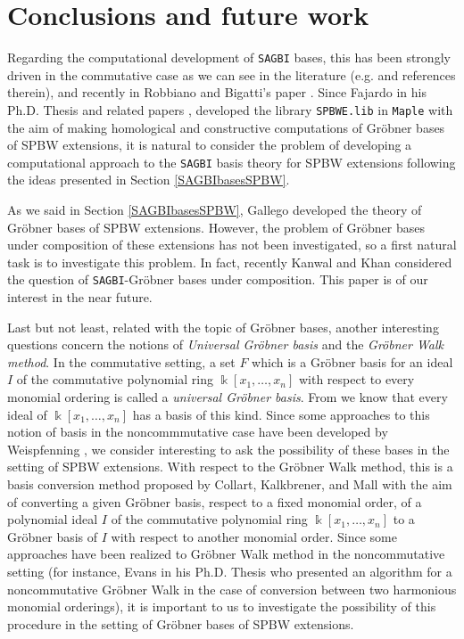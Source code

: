 \documentclass{amsart}
\theoremstyle{definition}
\theoremstyle{remark}
\numberwithin{equation}{section}
\begin{document}
\section{Conclusions and future work}\label{conclusionsfuturework}

 Regarding the computational development of \texttt{SAGBI} bases, this has been strongly driven in the commutative case as we can see in the literature (e.g.  \cite{Hashemietal2013, KreuzerRobbiano2005, Pfister} and references therein), and recently in Robbiano and Bigatti's paper \cite{RobbianoBigatti2022}. Since Fajardo in his Ph.D. Thesis \cite{Fajardo2018PhD} and related papers \cite{Fajardo2019, Fajardo2022}, \cite[Appendices C, D, E]{Fajardoetal2020} developed the library \texttt{SPBWE.lib} in \texttt{Maple} with the aim of making homological and constructive computations of Gr\"obner bases of SPBW extensions, it is natural to consider the problem of developing a computational approach to the \texttt{SAGBI} basis theory for SPBW extensions following the ideas presented in Section \ref{SAGBIbasesSPBW}.
 
As we said in Section \ref{SAGBIbasesSPBW}, Gallego developed the theory of Gr\"obner bases of SPBW extensions. However, the problem of Gr\"obner bases under composition of these extensions has not been investigated, so a first natural task is to investigate this problem. In fact, recently Kanwal and Khan \cite{KanwalKhan2023} considered the question of \texttt{SAGBI}-Gr\"obner bases under composition. This paper is of our interest in the near future.

Last but not least, related with the topic of Gr\"obner bases, another interesting questions concern the notions of {\em Universal Gr\"obner basis} and the {\em Gr\"obner Walk method}. In the commutative setting, a set $F$ which is a Gr\"obner basis for an ideal $I$ of the commutative polynomial ring $\Bbbk[x_1, \dotsc, x_n]$ with respect to every monomial ordering is called a {\em universal Gr\"obner basis}. From \cite[Exercise 1.8.6(d)]{AdamsLoustaunau1994} we know that every ideal of $\Bbbk[x_1, \dotsc, x_n]$ has a basis of this kind. Since some approaches to this notion of basis in the noncommmutative case have been developed by Weispfenning \cite{Weispfenning1989}, we consider interesting to ask the possibility of these bases in the setting of SPBW extensions. With respect to the Gr\"obner Walk method, this is a basis conversion method proposed by Collart, Kalkbrener, and Mall \cite{Collartetal1997} with the aim of converting a given Gr\"obner basis, respect to a fixed monomial order, of a polynomial ideal $I$ of the commutative polynomial ring $\Bbbk[x_1, \dotsc, x_n]$ to a Gr\"obner basis of $I$ with respect to another monomial order. Since some approaches have been realized to Gr\"obner Walk method in the noncommutative setting (for instance, Evans in his Ph.D.  Thesis \cite{Evans2005} who presented an algorithm for a noncommutative Gr\"obner Walk in the case of conversion between two harmonious monomial orderings), it is important to us to investigate the possibility of this procedure in the setting of Gr\"obner bases of SPBW extensions.
\end{document}
